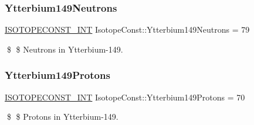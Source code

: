 \subsubsection{\texorpdfstring{Ytterbium149\+Neutrons}{Ytterbium149Neutrons}}
{\footnotesize\ttfamily \mbox{\hyperlink{group___isotope_const-_macros_ga5f18360b3e99483a35c32d789e62621c}{I\+S\+O\+T\+O\+P\+E\+C\+O\+N\+S\+T\+\_\+\+I\+NT}} Isotope\+Const\+::\+Ytterbium149\+Neutrons = 79}

\$ \$ Neutrons in Ytterbium-\/149. \mbox{\label{group___isotope_const-_ytterbium-_yb149_ga70d881295f93459a14e51e90351dd13f}} 
\subsubsection{\texorpdfstring{Ytterbium149\+Protons}{Ytterbium149Protons}}
{\footnotesize\ttfamily \mbox{\hyperlink{group___isotope_const-_macros_ga5f18360b3e99483a35c32d789e62621c}{I\+S\+O\+T\+O\+P\+E\+C\+O\+N\+S\+T\+\_\+\+I\+NT}} Isotope\+Const\+::\+Ytterbium149\+Protons = 70}

\$ \$ Protons in Ytterbium-\/149. 